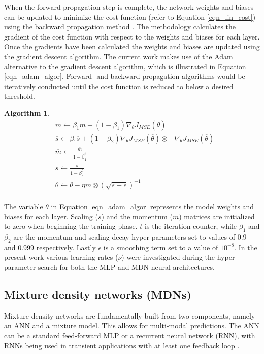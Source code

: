 \documentclass[a4paper,fleqn]{cas-sc}
\newtheorem{theorem}{Algorithm}
\begin{document}
When the forward propagation step is complete, the network weights and biases can be updated to minimize the cost function (refer to Equation \ref{eqn_lin_cost}) using the backward propagation method \cite{Rumelhart1986}. The methodology calculates the gradient of the cost function with respect to the weights and biases for each layer. Once the gradients have been calculated the weights and biases are updated using the gradient descent algorithm. The current work makes use of the Adam \cite{goodfellow} alternative to the gradient descent algorithm, which is illustrated in Equation \ref{eqn_adam_algor}. Forward- and backward-propagation algorithms would be iteratively conducted until the cost function is reduced to below a desired threshold.
\begin{theorem} 
\begin{equation}\label{eqn_adam_algor} 
\begin{split}
&\overline{m}\leftarrow \beta_1\overline{m}+(1-\beta_1)\nabla_{\theta}J_{MSE}(\overline{\theta})\\
&\overline{s}\leftarrow \beta_1\overline{s}+(1-\beta_2)\nabla_{\theta}J_{MSE}(\overline{\theta})\otimes&\nabla_{\theta}J_{MSE}(\overline{\theta})\\
&\overline{m}\leftarrow\frac{\overline{m}}{1-\beta_1^t} \\
&\overline{s}\leftarrow\frac{\overline{s}}{1-\beta_2^t}\\
&\overline{\theta}\leftarrow\overline{\theta}-\eta\overline{m}\otimes(\sqrt{\overline{s}+\epsilon})^{-1}\\
\end{split}
\end{equation}
\end{theorem}

The variable $\bar{\theta}$ in Equation \ref{eqn_adam_algor} represents the model weights and biases for each layer. Scaling ($\bar{s}$) and the momentum ($\bar{m}$) matrices are initialized to zero when beginning the training phase. $t$ is the iteration counter, while $\beta_1$ and $\beta_2$ are the momentum and scaling decay hyper-parameters set to values of 0.9 and 0.999 respectively. Lastly $\epsilon$ is a smoothing term set to a value of $10^{-8}$. In the present work various learning rates ($\nu$) were investigated during the hyper-parameter search for both the MLP and MDN neural architectures.

\subsection{Mixture density networks (MDNs)}
Mixture density networks are fundamentally built from two components, namely an ANN and a mixture model. This allows for multi-modal predictions. The ANN can be a standard feed-forward MLP or a recurrent neural network (RNN), with RNNs being used in transient applications with at least one feedback loop \citep{Oko2015}.\\
\end{document}
